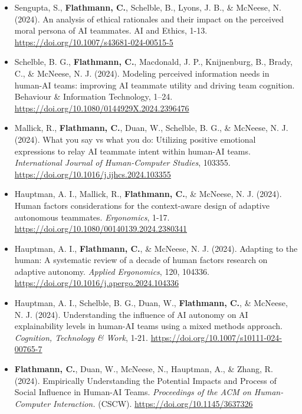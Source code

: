 \begin{itemize}[align=left, labelwidth=3em,]
\item[JA.23] Sengupta, S., \textbf{Flathmann, C.}, Schelble, B., Lyons, J. B., \& McNeese, N. (2024). An analysis of ethical rationales and their impact on the perceived moral persona of AI teammates. AI and Ethics, 1-13. \url{https://doi.org/10.1007/s43681-024-00515-5}

\item[JA.22] Schelble, B. G., \textbf{Flathmann, C.}, Macdonald, J. P., Knijnenburg, B., Brady, C., \& McNeese, N. J. (2024). Modeling perceived information needs in human-AI teams: improving AI teammate utility and driving team cognition. Behaviour \& Information Technology, 1–24. \url{https://doi.org/10.1080/0144929X.2024.2396476}

\item[JA.21] Mallick, R., \textbf{Flathmann, C.}, Duan, W., Schelble, B. G., \& McNeese, N. J. (2024). What you say vs what you do: Utilizing positive emotional expressions to relay AI teammate intent within human-AI teams. \textit{International Journal of Human-Computer Studies}, 103355. 
\url{https://doi.org/10.1016/j.ijhcs.2024.103355}

\item[JA.20] Hauptman, A. I., Mallick, R., \textbf{Flathmann, C.}, \& McNeese, N. J. (2024). Human factors considerations for the context-aware design of adaptive autonomous teammates. \textit{Ergonomics}, 1-17.
\url{https://doi.org/10.1080/00140139.2024.2380341}

\item[JA.19] Hauptman, A. I., \textbf{Flathmann, C.}, \& McNeese, N. J. (2024). Adapting to the human: A systematic review of a decade of human factors research on adaptive autonomy. \textit{Applied Ergonomics}, 120, 104336. \url{https://doi.org/10.1016/j.apergo.2024.104336}

\item[JA.18] Hauptman, A. I., Schelble, B. G., Duan, W., \textbf{Flathmann, C.}, \& McNeese, N. J. (2024). Understanding the influence of AI autonomy on AI explainability levels in human-AI teams using a mixed methods approach. \textit{Cognition, Technology \& Work}, 1-21. \url{https://doi.org/10.1007/s10111-024-00765-7}\\

\item[JA.17] \textbf{Flathmann, C.}, Duan, W., McNeese, N., Hauptman, A., \& Zhang, R. (2024). Empirically Understanding the Potential Impacts and Process of Social Influence in Human-AI Teams. \textit{Proceedings of the ACM on Human-Computer Interaction.} (CSCW). \url{https://doi.org/10.1145/3637326}\\


\end{itemize}
